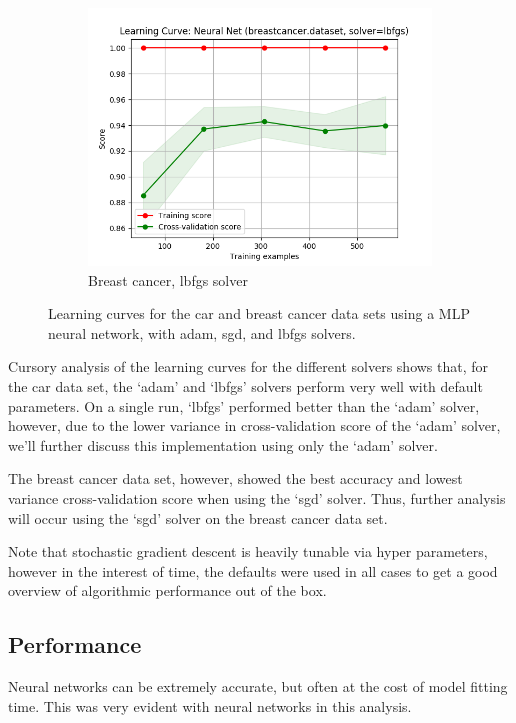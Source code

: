 \documentclass{article}
\begin{document}
\begin{figure}[htb]
\begin{subfigure}{0.33\textwidth}
      \includegraphics[width=\linewidth]{out/neural_net/breastcancer-solver-lbfgs.png}
      \caption{Breast cancer, lbfgs solver}
      \label{fig:nn-param-6}
    \end{subfigure}

    \caption{Learning curves for the car and breast cancer data sets using a MLP neural network, with adam, sgd, and lbfgs solvers.}
    \label{fig:nn-param}
    \end{figure}

    Cursory analysis of the learning curves for the different solvers shows that, for the car data set, the `adam' and `lbfgs' solvers perform very well with default parameters. On a single run, `lbfgs' performed better than the `adam' solver, however, due to the lower variance in cross-validation score of the `adam' solver, we'll further discuss this implementation using only the `adam' solver.

    The breast cancer data set, however, showed the best accuracy and lowest variance cross-validation score when using the `sgd' solver. Thus, further analysis will occur using the `sgd' solver on the breast cancer data set.

    Note that stochastic gradient descent is heavily tunable via hyper parameters, however in the interest of time, the defaults were used in all cases to get a good overview of algorithmic performance out of the box.

    \subsection{Performance}
    Neural networks can be extremely accurate, but often at the cost of model fitting time. This was very evident with neural networks in this analysis.
\end{document}
